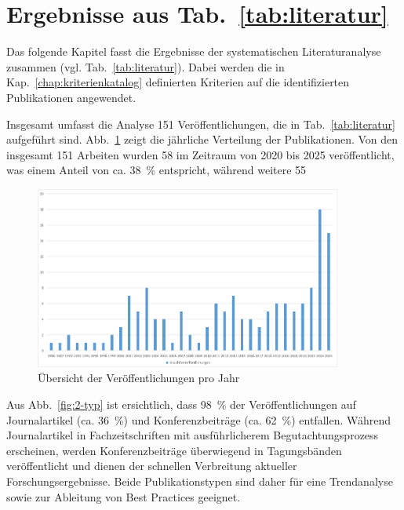 \section{Ergebnisse aus Tab.~\ref{tab:literatur}}

Das folgende Kapitel fasst die Ergebnisse der systematischen Literaturanalyse zusammen (vgl. Tab.~\ref{tab:literatur}). Dabei werden die in Kap.~\ref{chap:kriterienkatalog} definierten Kriterien auf die identifizierten Publikationen angewendet.

Insgesamt umfasst die Analyse 151 Veröffentlichungen, die in Tab.~\ref{tab:literatur} aufgeführt sind. Abb.~\ref{fig:1-veroeffentlichungen-jahr} zeigt die jährliche Verteilung der Publikationen. Von den insgesamt 151 Arbeiten wurden 58 im Zeitraum von 2020 bis 2025 veröffentlicht, was einem Anteil von ca. 38~\% entspricht, während weitere 55~%

\begin{figure}[htbp]
    \centering
    \includegraphics[width=0.90\textwidth]{graphics/1-veroeffentlichungen-jahr.png}
    \caption{Übersicht der Veröffentlichungen pro Jahr}
    \label{fig:1-veroeffentlichungen-jahr}
\end{figure}

Aus Abb.~\ref{fig:2-typ} ist ersichtlich, dass 98~\% der Veröffentlichungen auf Journalartikel (ca. 36~\%) und Konferenzbeiträge (ca. 62~\%) entfallen. Während Journalartikel in Fachzeitschriften mit ausführlicherem Begutachtungsprozess erscheinen, werden Konferenzbeiträge überwiegend in Tagungsbänden veröffentlicht und dienen der schnellen Verbreitung aktueller Forschungsergebnisse. Beide Publikationstypen sind daher für eine Trendanalyse sowie zur Ableitung von Best Practices geeignet.

